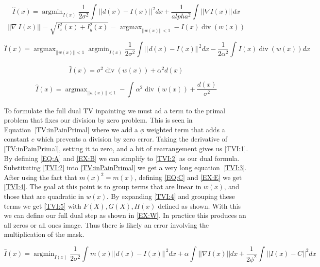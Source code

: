 \documentclass[12pt]{article}
\DeclareMathOperator*{\argmin}{argmin}
\DeclareMathOperator*{\argmax}{argmax}
\DeclareMathOperator*{\diver}{div}
\begin{document}
\begin{equation}
\hat{I}(x) = \argmin_{I(x)} \frac{1}{2\sigma^2} \int_{}^{}||d(x) - I(x)||^2 dx + \frac{1}{alpha^2}\int_{}^{}||\nabla I(x)|| dx 
\label{TV:Primal}
\end{equation}
\begin{equation}
||\nabla~I(x)|| = \sqrt{I_x^2(x)+I_y^2(x)} = \argmax_{||w(x)||<1}-I(x)\diver(w(x))
\label{TV:L1toDiv}
\end{equation}

\begin{equation}
\hat{I}(x) =\argmax_{||w(x)||<1} \argmin_{I(x)} \frac{1}{2\sigma^2} \int_{}^{}||d(x) - I(x)||^2 dx - \frac{1}{2\alpha^2}\int_{}^{}I(x)\diver(w(x)) dx 
\label{TV:preDual}
\end{equation}

\begin{equation}
\hat{I}(x) =\sigma^2\diver(w(x)) + \alpha^2d(x)
\label{TV:dual}
\end{equation}

\begin{equation}
\hat{I}(x) =\argmax_{||w(x)||<1} -\int_{}^{}\alpha^2\diver(w(x)) + \frac{d(x)}{\sigma^2}
\label{TV:simplePrimal}
\end{equation}

\par{}
To formulate the full dual TV inpainting we must ad a term to the primal problem that fixes our division by zero problem. This is seen in Equation~\ref{TV:inPainPrimal} where we add a $\phi$ weighted term that adds a constant $c$ which prevents a division by zero error. Taking the derivative of \ref{TV:inPainPrimal}, setting it to zero, and a bit of rearrangement gives us \ref{TVI:1}. By defining \ref{EQ:A} and \ref{EX:B} we can simplify to \ref{TVI:2} as our dual formula. Substituting \ref{TVI:2} into \ref{TV:inPainPrimal} we get a very long equation~\ref{TVI:3}. After using the fact that $m(x)^2 = m(x)$, defining \ref{EQ:C} and \ref{EX:E} we get \ref{TVI:4}. The goal at this point is to group terms that are linear in $w(x)$, and those that are quadratic in $w(x)$. By expanding \ref{TVI:4} and grouping these terms we get \ref{TVI:5} with $F(X),G(X),H(x)$ defined as shown. With this we can define our full dual step as shown in \ref{EX:W}. In practice this produces an all zeros or all ones image. Thus there is likely an error involving the multiplication of the mask.


\begin{equation}
\hat{I}(x) = \argmin_{I(x)} \frac{1}{2\sigma^2} \int_{}^{}m(x)||d(x) - I(x)||^2 dx + \alpha\int_{}^{}||\nabla I(x)|| dx + \frac{1}{2\phi^2}\int_{}^{}||I(x)-C||^2 dx
\label{TV:inPainPrimal}
\end{equation}
\end{document}
